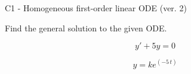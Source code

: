 \begin{exercise}
  \begin{exerciseTitle}C1 - Homogeneous first-order linear ODE (ver. 2)\end{exerciseTitle}
  \begin{exerciseStatement}
    
Find the general solution to the given ODE.

    
\[y'+5y=0\]

  \end{exerciseStatement}
  \begin{exerciseAnswer}
    
\[y= k e^{\left(-5 \, t\right)}\]

  \end{exerciseAnswer}
\end{exercise}